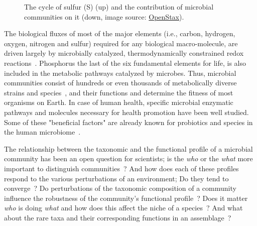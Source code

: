 \begin{figure}[!h]
         \caption[The cycle of S and the role of microbial communities]{
            The cycle of sulfur (S) (up) and the contribution of microbial communities on it (down, image source: \href{https://openstax.org/resources/3002d0fba25221d24455917117482a079a11f321}{OpenStax}).
         }
         \label{fig:co2}
      \end{figure}

      The biological fluxes of most of the major elements (i.e., carbon, hydrogen, oxygen, nitrogen and sulfur) required
      for any biological macro-molecule,
      are driven largely
      by microbially catalyzed, thermodynamically constrained redox reactions~\citep{falkowski2008microbial}. 
      Phosphorus the last of the six fundamental elements for life, is also included in the metabolic pathways catalyzed by microbes. 
      Thus, microbial communities consist of hundreds or even thousands of metabolically diverse strains and species~\citep{leventhal2018strain},
      and their functions
      and determine the fitness of most organisms on Earth. 
      In case of human health, specific microbial enzymatic pathways and molecules necessary for health promotion have been well studied.
      Some of these "beneficial factors" are already known for probiotics and species in the human microbiome~\citep{marco2021defining}.

      The relationship between the taxonomic and the functional profile of a microbial community
      has been an open question for scientists; is the \textit{who} or the \textit{what} more important
      to distinguish communities~\citep{xu2014more}?
      And how does each of these profiles respond to the various perturbations of an environment; 
      Do they tend to converge~\citep{estrela2022functional}?
      Do perturbations of the taxonomic composition of a community influence the robustness of the community’s functional profile~\citep{eng2018taxa}?
      Does it matter \textit{who} is doing \textit{what} and how does this affect 
      the niche of a species~\citep{louca2018function}?  
      And what about the rare taxa and their corresponding functions in an assemblage~\citep{chen2020rare, jousset2017less}?


